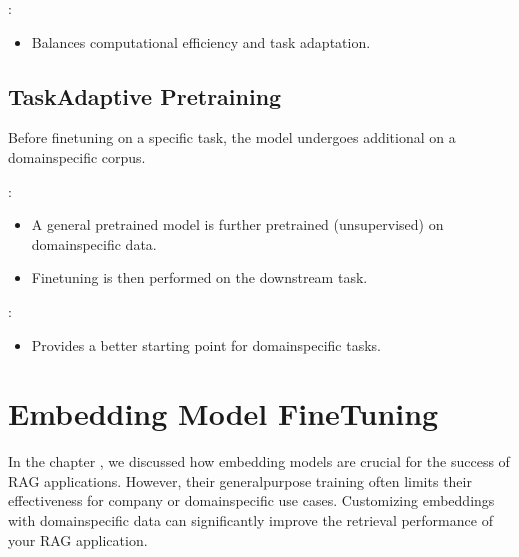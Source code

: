 \documentclass[letterpaper,11pt,english]{sphinxmanual}
\begin{document}
\sphinxAtStartPar
{}:
\begin{itemize}
\item {} 
\sphinxAtStartPar
Balances computational efficiency and task adaptation.

\end{itemize}


\subsection{Task\sphinxhyphen{}Adaptive Pre\sphinxhyphen{}training}
\label{\detokenize{finetuning:task-adaptive-pre-training}}
\sphinxAtStartPar
Before fine\sphinxhyphen{}tuning on a specific task, the model undergoes additional  on a domain\sphinxhyphen{}specific corpus.

\sphinxAtStartPar
{}:
\begin{itemize}
\item {} 
\sphinxAtStartPar
A general pre\sphinxhyphen{}trained model is further pre\sphinxhyphen{}trained (unsupervised) on domain\sphinxhyphen{}specific data.

\item {} 
\sphinxAtStartPar
Fine\sphinxhyphen{}tuning is then performed on the downstream task.

\end{itemize}

\sphinxAtStartPar
{}:
\begin{itemize}
\item {} 
\sphinxAtStartPar
Provides a better starting point for domain\sphinxhyphen{}specific tasks.

\end{itemize}


\section{Embedding Model Fine\sphinxhyphen{}Tuning}
\label{\detokenize{finetuning:embedding-model-fine-tuning}}
\sphinxAtStartPar
In the chapter {\hyperref[\detokenize{rag:rag}]{}}, we discussed how embedding models are crucial for the success of RAG applications.
However, their general\sphinxhyphen{}purpose training often limits their effectiveness for company\sphinxhyphen{} or domain\sphinxhyphen{}specific
use cases. Customizing embeddings with domain\sphinxhyphen{}specific data can significantly improve the retrieval
performance of your RAG application.
\end{document}
